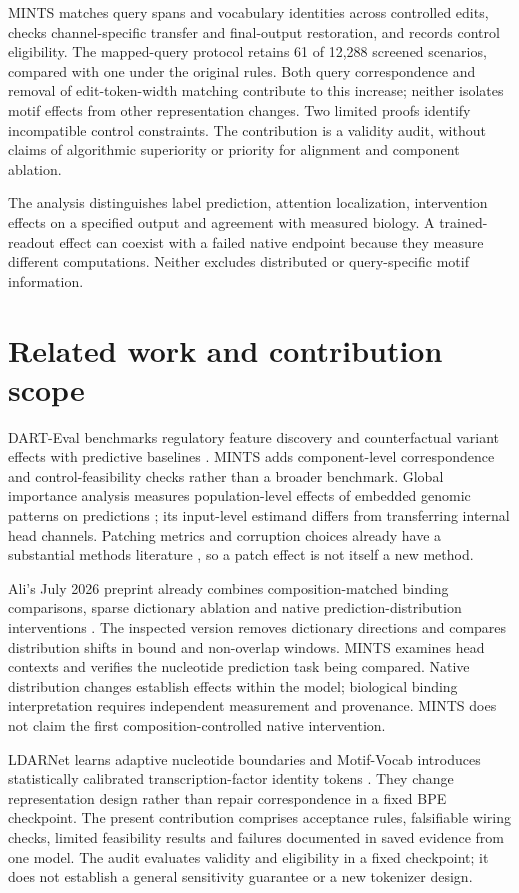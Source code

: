 \documentclass[10pt,letterpaper]{article}
\begin{document}
MINTS matches query spans and vocabulary identities across controlled edits, checks channel-specific transfer and final-output restoration, and records control eligibility. The mapped-query protocol retains 61 of 12,288 screened scenarios, compared with one under the original rules. Both query correspondence and removal of edit-token-width matching contribute to this increase; neither isolates motif effects from other representation changes. Two limited proofs identify incompatible control constraints. The contribution is a validity audit, without claims of algorithmic superiority or priority for alignment and component ablation.

The analysis distinguishes label prediction, attention localization, intervention effects on a specified output and agreement with measured biology. A trained-readout effect can coexist with a failed native endpoint because they measure different computations. Neither excludes distributed or query-specific motif information.
\section{Related work and contribution scope}
DART-Eval benchmarks regulatory feature discovery and counterfactual variant effects with predictive baselines \citep{patel2024dart}. MINTS adds component-level correspondence and control-feasibility checks rather than a broader benchmark. Global importance analysis measures population-level effects of embedded genomic patterns on predictions \citep{koo2021gia}; its input-level estimand differs from transferring internal head channels. Patching metrics and corruption choices already have a substantial methods literature \citep{zhang2024metrics,heimersheim2024patching}, so a patch effect is not itself a new method.

Ali's July 2026 preprint already combines composition-matched binding comparisons, sparse dictionary ablation and native prediction-distribution interventions \citep{ali2026causal}. The inspected version removes dictionary directions and compares distribution shifts in bound and non-overlap windows. MINTS examines head contexts and verifies the nucleotide prediction task being compared. Native distribution changes establish effects within the model; biological binding interpretation requires independent measurement and provenance. MINTS does not claim the first composition-controlled native intervention.

LDARNet learns adaptive nucleotide boundaries and Motif-Vocab introduces statistically calibrated transcription-factor identity tokens \citep{ledneva2026ldarnet,li2026motifvocab}. They change representation design rather than repair correspondence in a fixed BPE checkpoint. The present contribution comprises acceptance rules, falsifiable wiring checks, limited feasibility results and failures documented in saved evidence from one model. The audit evaluates validity and eligibility in a fixed checkpoint; it does not establish a general sensitivity guarantee or a new tokenizer design.
\end{document}
